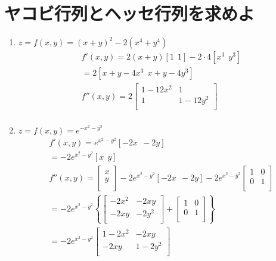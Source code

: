 \documentclass[a4paper,10pt]{jarticle}
\begin{document}
\section{ヤコビ行列とヘッセ行列を求めよ}
\begin{enumerate}
\item $z = f(x,y) = (x+y)^2-2(x^4+y^4)$\begin{gather*}
	f'(x,y) = 2(x+y) [1 \ \ 1]-2 \cdot 4 [x^3 \ \ y^3] \\
	=2[x+y-4x^3 \ \ x+y-4y^3] \\
	f''(x,y) = 2
	\left[    \begin{array}{cc}
		1-12x^2 & 1 \\
		1 &  1-12y^2\\
	\end{array}  \right] \\
\end{gather*}
\item$ z = f(x,y) = e^{-x^2-y^2}$\begin{gather*}
	f'(x,y) = e^{x^2-y^2} [-2x \ \ -2y] \\
	= -2e^{x^2-y^2} [x \ \ y] \\
	f''(x,y) = 
	\left[    \begin{array}{c}
		x \\
		y \\
	\end{array}  \right] 
	-2e^{x^2-y^2} [-2x \ \ -2y] -2e^{x^2-y^2}
	\left[    \begin{array}{cc}
		1 & 0 \\
		0 &  1\\
	\end{array}  \right] \\
	= -2e^{x^2-y^2} \left\{
	\left[    \begin{array}{cc}
		-2x^2 & -2xy \\
		-2xy &  -2y^2\\
	\end{array}  \right] +
	\left[    \begin{array}{cc}
		1 & 0 \\
		0 &  1\\
	\end{array}  \right] 
	\right\} \\
	= -2e^{x^2-y^2}
	\left[    \begin{array}{cc}
		1-2x^2 & -2xy \\
		-2xy &  1-2y^2\\
	\end{array} \right] 
\end{gather*}
\end{enumerate}
\end{document}
